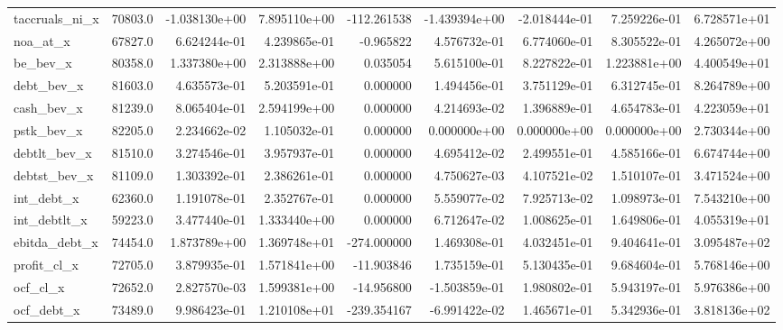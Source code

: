 \documentclass[10pt]{article}
\begin{document}
\begin{landscape}
\begin{longtable}{lrrrrrrrr}
taccruals\_ni\_x          &   70803.0 & -1.038130e+00 &  7.895110e+00 &   -112.261538 & -1.439394e+00 & -2.018444e-01 &  7.259226e-01 &  6.728571e+01 \\
noa\_at\_x                &   67827.0 &  6.624244e-01 &  4.239865e-01 &     -0.965822 &  4.576732e-01 &  6.774060e-01 &  8.305522e-01 &  4.265072e+00 \\
be\_bev\_x                &   80358.0 &  1.337380e+00 &  2.313888e+00 &      0.035054 &  5.615100e-01 &  8.227822e-01 &  1.223881e+00 &  4.400549e+01 \\
debt\_bev\_x              &   81603.0 &  4.635573e-01 &  5.203591e-01 &      0.000000 &  1.494456e-01 &  3.751129e-01 &  6.312745e-01 &  8.264789e+00 \\
cash\_bev\_x              &   81239.0 &  8.065404e-01 &  2.594199e+00 &      0.000000 &  4.214693e-02 &  1.396889e-01 &  4.654783e-01 &  4.223059e+01 \\
pstk\_bev\_x              &   82205.0 &  2.234662e-02 &  1.105032e-01 &      0.000000 &  0.000000e+00 &  0.000000e+00 &  0.000000e+00 &  2.730344e+00 \\
debtlt\_bev\_x            &   81510.0 &  3.274546e-01 &  3.957937e-01 &      0.000000 &  4.695412e-02 &  2.499551e-01 &  4.585166e-01 &  6.674744e+00 \\
debtst\_bev\_x            &   81109.0 &  1.303392e-01 &  2.386261e-01 &      0.000000 &  4.750627e-03 &  4.107521e-02 &  1.510107e-01 &  3.471524e+00 \\
int\_debt\_x              &   62360.0 &  1.191078e-01 &  2.352767e-01 &      0.000000 &  5.559077e-02 &  7.925713e-02 &  1.098973e-01 &  7.543210e+00 \\
int\_debtlt\_x            &   59223.0 &  3.477440e-01 &  1.333440e+00 &      0.000000 &  6.712647e-02 &  1.008625e-01 &  1.649806e-01 &  4.055319e+01 \\
ebitda\_debt\_x           &   74454.0 &  1.873789e+00 &  1.369748e+01 &   -274.000000 &  1.469308e-01 &  4.032451e-01 &  9.404641e-01 &  3.095487e+02 \\
profit\_cl\_x             &   72705.0 &  3.879935e-01 &  1.571841e+00 &    -11.903846 &  1.735159e-01 &  5.130435e-01 &  9.684604e-01 &  5.768146e+00 \\
ocf\_cl\_x                &   72652.0 &  2.827570e-03 &  1.599381e+00 &    -14.956800 & -1.503859e-01 &  1.980802e-01 &  5.943197e-01 &  5.976386e+00 \\
ocf\_debt\_x              &   73489.0 &  9.986423e-01 &  1.210108e+01 &   -239.354167 & -6.991422e-02 &  1.465671e-01 &  5.342936e-01 &  3.818136e+02 \\

\end{longtable}
\end{landscape}
\end{document}
